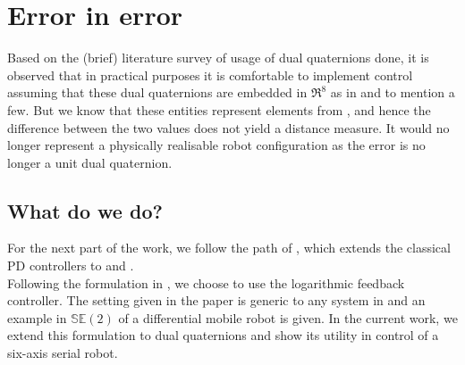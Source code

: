 \documentclass[a4paper,12pt]{article}
\begin{document}
\section{Error in error}
Based on the (brief) literature survey of usage of dual quaternions done, it is observed that in practical purposes it is comfortable to implement control assuming that these dual quaternions are embedded in $\Re^8$ as in \cite{pham2010position} and \cite{adorno2010dual} to mention a few. But we know that these entities represent elements from \SE, and hence the difference between the two values does not yield a distance measure. It would no longer represent a physically realisable robot configuration as the error is no longer a unit dual quaternion.

\subsection{What do we do?}
For the next part of the work, we follow the path of \cite{bullo1995proportional}, which extends the classical PD controllers to \SO and \SE.\\
Following the formulation in \cite{bullo1995proportional}, we choose to use the logarithmic feedback controller. The setting given in the paper is generic to any system in \SE and an example in $\ensuremath{\mathbb{SE}(2)}\xspace$ of a differential mobile robot is given. In the current work, we extend this formulation to dual quaternions and show its utility in control of a six-axis serial robot.
\end{document}

